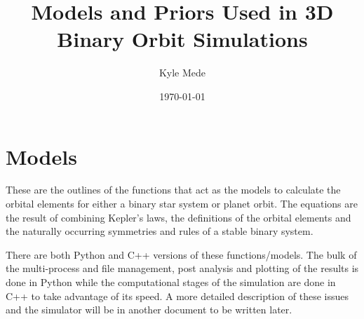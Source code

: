\documentclass[12pt,preprint]{aastex}
\title{Models and Priors Used in 3D Binary Orbit Simulations}
\author{Kyle Mede}
\date{\today}
\begin{document}
\maketitle


\tableofcontents

\section{Models}

These are the outlines of the functions that act as the models to calculate the orbital elements for either a binary star system or planet orbit.  The equations are the result of combining Kepler's laws, the definitions of the orbital elements and the naturally occurring symmetries and rules of a stable binary system.

There are both Python and C++ versions of these functions/models.  The bulk of the multi-process and file management,  post analysis and plotting of the results is done in Python while the computational stages of the simulation are done in C++ to take advantage of its speed.  A more detailed description of these issues and the simulator will be in another document to be written later.





\end{document}
